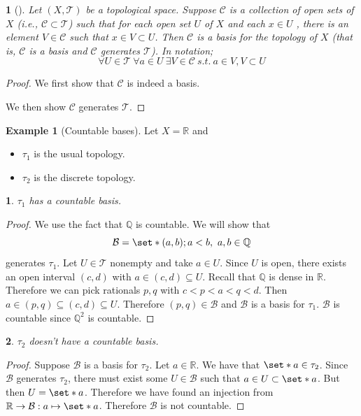 \documentclass[11pt]{article}
\numberwithin{equation}{section}
\theoremstyle{plain}
\newtheorem{claim}{\color{ForestGreen}{\textbf{Claim}}}[section]
\newtheorem{lemma}[theorem]{\color{ForestGreen}{\textbf{Lemma}}}
\theoremstyle{definition}
\newtheorem{example}{\color{WildStrawberry}Example}[section]
\def\Set{\set*}%
\def\ss{\subset}
\def\sse{\subseteq}
\newcommand{\1}{\mathbbm 1}
\def\t{\tau}
\newcommand{\RR}{\mathbb R}
\newcommand{\QQ}{\mathbb Q}
\newcommand{\tT}{\mathcal T}
\newcommand{\bB}{\mathcal B}
\newcommand{\cC}{\mathcal C}
\begin{document}
\begin{lemma}[]
	Let $(X,\tT)$ be a topological space. Suppose $\cC$ is a collection of open sets of $X$ (i.e., $\cC \ss \tT$) such that for each open set $U$ of $X$ and each $x \in U$ , there is an element $V \in \cC$ such that $x \in V \ss U$. Then $\cC$ is a basis for the topology of $X$ (that is, $\cC$ is a basis \emph{and} $\cC$ generates $\tT$). In notation;
	\begin{equation*}
		\forall U \in \tT \ \forall a\in U \ \exists V \in \cC \ s.t. \ a \in V, V \ss U 
	\end{equation*}
	
\end{lemma}
\begin{proof}
	We first show that $\cC$ is indeed a basis. 

	We then show $\cC$ generates $\tT$. 

\end{proof}


\begin{example}[Countable bases]
	Let $X = \RR$ and 
	\begin{itemize}
		\item $\t_1$ is the usual topology.
		\item $\t_2$ is the discrete topology. 
	\end{itemize}

	\begin{claim}
		$\t_1$ has a countable basis.
	\end{claim}
	\begin{proof}
		We use the fact that $\QQ$ is countable. We will show that
		\begin{equation}
			\bB = \Set{(a,b); a<b, \ a,b \in \QQ}
		\end{equation}
		generates $\t_1$. Let $U \in \tT$ nonempty and take $a \in U$. Since $U$ is open, there exists an open interval $(c,d)$ with $a \in (c,d) \sse U$. Recall that $\QQ$ is dense in $\RR$. Therefore we can pick rationals $p,q$ with $c<p<a<q<d$. Then $a \in (p,q) \sse (c,d) \sse U$. Therefore $(p,q) \in \bB$ and $\bB$ is a basis for $\t_1$. $\bB$ is countable since $\QQ^2$ is countable. 
	\end{proof}

	\begin{claim}
		$\t_2$ doesn't have a countable basis. 
	\end{claim}
	\begin{proof}
		Suppose $\bB$ is a basis for $\t_2$. Let $a \in \RR$. We have that $\Set{a} \in \t_2$. Since $\bB$ generates $\t_2$, there must exist some $U \in \bB$ such that $a \in U \ss \Set{a}$. But then $U = \Set{a}$. Therefore we have found an injection from $\RR \to \bB:a \mapsto \Set{a}$. Therefore $\bB$ is not countable. 
	\end{proof}
	
	
	
	
\end{example}
\end{document}
